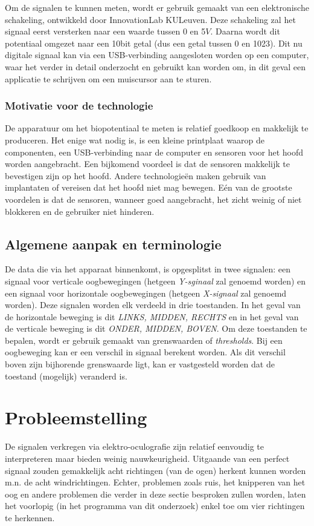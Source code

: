 \documentclass{article}
\begin{document}
Om de signalen te kunnen meten, wordt er gebruik gemaakt van een elektronische schakeling, ontwikkeld door InnovationLab KULeuven. Deze schakeling zal het signaal eerst versterken naar een waarde tussen 0 en 5$V$. Daarna wordt dit potentiaal omgezet naar een 10bit getal (dus een getal tussen 0 en 1023). Dit nu digitale signaal kan via een USB-verbinding aangesloten worden op een computer, waar het verder in detail onderzocht en gebruikt kan worden om, in dit geval een applicatie te schrijven om een muiscursor aan te sturen.

\subsubsection{Motivatie voor de technologie}
De apparatuur om het biopotentiaal te meten is relatief goedkoop en makkelijk te produceren. Het enige wat nodig is, is een kleine printplaat waarop de componenten, een USB-verbinding naar de computer en sensoren voor het hoofd worden aangebracht.
Een bijkomend voordeel is dat de sensoren makkelijk te bevestigen zijn op het hoofd. Andere technologie\"en maken gebruik van implantaten of vereisen dat het hoofd niet mag bewegen. E\'en van de grootste voordelen is dat de sensoren, wanneer goed aangebracht, het zicht weinig of niet blokkeren en de gebruiker niet hinderen.

\subsection{Algemene aanpak en terminologie}
De data die via het apparaat binnenkomt, is opgesplitst in twee signalen: een signaal voor verticale oogbewegingen (hetgeen \textit{Y-sginaal} zal genoemd worden) en een signaal voor horizontale oogbewegingen (hetgeen \textit{X-signaal} zal genoemd worden). Deze signalen worden elk verdeeld in drie toestanden. In het geval van de horizontale beweging is dit \textit{LINKS, MIDDEN, RECHTS} en in het geval van de verticale beweging is dit \textit{ONDER, MIDDEN, BOVEN}. Om deze toestanden te bepalen, wordt er gebruik gemaakt van grenswaarden of \textit{thresholds}. Bij een oogbeweging kan er een verschil in signaal berekent worden. Als dit verschil boven zijn bijhorende grenswaarde ligt, kan er vastgesteld worden dat de toestand (mogelijk) veranderd is.
\section{Probleemstelling}
De signalen verkregen via elektro-oculografie zijn relatief eenvoudig te interpreteren maar bieden weinig nauwkeurigheid. Uitgaande van een perfect signaal zouden gemakkelijk acht richtingen (van de ogen) herkent kunnen worden m.n. de acht windrichtingen. Echter, problemen zoals ruis, het knipperen van het oog en andere problemen die verder in deze sectie besproken zullen worden, laten het voorlopig (in het programma van dit onderzoek) enkel toe om vier richtingen te herkennen. 
\end{document}
